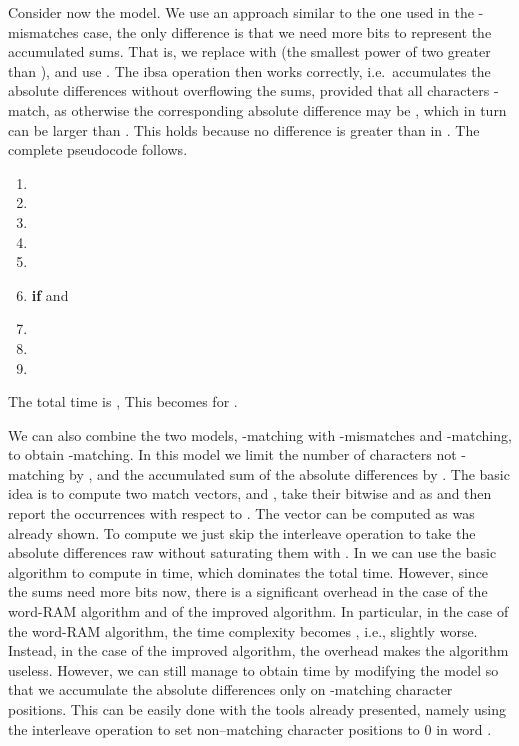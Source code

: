 \documentclass{llncs}
\def \band{\textsf{and}\xspace}
\begin{document}
Consider now the  model. We use an approach similar to the one
used in the -mismatches case, the only difference is that we need
more bits to represent the accumulated sums. That is, we replace
 with  (the
smallest power of two greater than ), and use . The \textsf{ibsa} operation then works correctly,
i.e.\ accumulates the absolute differences without overflowing the
sums, provided that all characters -match, as otherwise the
corresponding absolute difference may be , which in turn can
be larger than .
This holds because no difference is greater than  in .
The complete pseudocode follows.
\begin{enumerate}
\item 
\item 
\item 
\item 
\item 
\item \textbf{if}  and 
\item \qquad 
\item \qquad 
\item \qquad 
\end{enumerate}
The total time is ,
This becomes  for .

We can also combine the two models, -matching with
-mismatches and -matching, to obtain
-matching. In this model we limit the number of
characters not -matching by , and the accumulated sum of
the absolute differences by . The basic idea is to compute two
match vectors,  and , take their bitwise \band as
 and then report the occurrences
with respect to . The vector  can be computed as was
already shown. To compute  we just skip the
\textsf{interleave} operation to take the absolute differences
raw without saturating them with . In  we can use the
basic algorithm to compute  in
 time, which dominates
the total time. However, since the sums need more bits now, there is a
significant overhead in the case of the word-RAM algorithm and of the
improved  algorithm. In particular, in the case of the word-RAM
algorithm, the time complexity becomes
, i.e., slightly worse. Instead, in the
case of the improved  algorithm, the overhead makes the
algorithm useless. However, we can still manage to obtain
 time by modifying the model so that we accumulate the
absolute differences only on -matching character positions.
This can be easily done with the tools already presented, namely using
the \textsf{interleave} operation to set non--matching
character positions to 0 in word .
\end{document}
